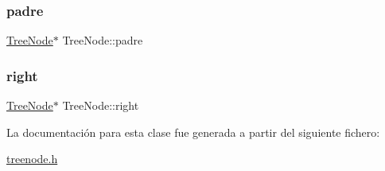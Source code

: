 \mbox{\label{class_tree_node_aa38d6c9fc05bcf7a2ff2d2ee58cc810b}} 
\subsubsection{\texorpdfstring{padre}{padre}}
{\footnotesize\ttfamily \mbox{\hyperlink{class_tree_node}{Tree\+Node}}$\ast$ Tree\+Node\+::padre}

\mbox{\label{class_tree_node_a71b4faa364404d671943562b352b1b74}} 
\subsubsection{\texorpdfstring{right}{right}}
{\footnotesize\ttfamily \mbox{\hyperlink{class_tree_node}{Tree\+Node}}$\ast$ Tree\+Node\+::right}



La documentación para esta clase fue generada a partir del siguiente fichero\+:\begin{DoxyCompactItemize}
\item 
\mbox{\hyperlink{treenode_8h}{treenode.\+h}}\end{DoxyCompactItemize}
